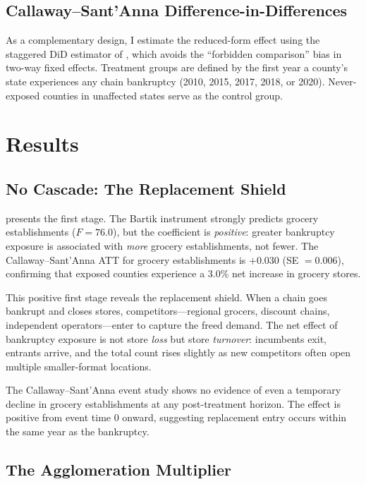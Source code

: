 \documentclass[12pt]{article}
\begin{document}
\subsection{Callaway--Sant'Anna Difference-in-Differences}

As a complementary design, I estimate the reduced-form effect using the staggered DiD estimator of \citet{callaway2021difference}, which avoids the ``forbidden comparison'' bias in two-way fixed effects. Treatment groups are defined by the first year a county's state experiences any chain bankruptcy (2010, 2015, 2017, 2018, or 2020). Never-exposed counties in unaffected states serve as the control group.


\section{Results}
\label{sec:results}

\subsection{No Cascade: The Replacement Shield}

 presents the first stage. The Bartik instrument strongly predicts grocery establishments ($F = 76.0$), but the coefficient is \emph{positive}: greater bankruptcy exposure is associated with \emph{more} grocery establishments, not fewer. The Callaway--Sant'Anna ATT for grocery establishments is $+0.030$ (SE $= 0.006$), confirming that exposed counties experience a 3.0\% net increase in grocery stores.

This positive first stage reveals the replacement shield. When a chain goes bankrupt and closes stores, competitors---regional grocers, discount chains, independent operators---enter to capture the freed demand. The net effect of bankruptcy exposure is not store \emph{loss} but store \emph{turnover}: incumbents exit, entrants arrive, and the total count rises slightly as new competitors often open multiple smaller-format locations.

The Callaway--Sant'Anna event study shows no evidence of even a temporary decline in grocery establishments at any post-treatment horizon. The effect is positive from event time 0 onward, suggesting replacement entry occurs within the same year as the bankruptcy.



\subsection{The Agglomeration Multiplier}
\end{document}
